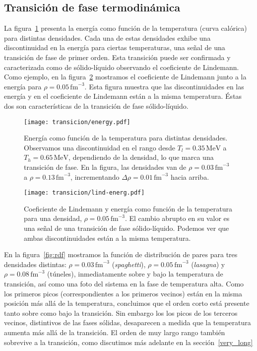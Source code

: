 \subsection{Transición de fase termodinámica}

La figura~\ref{fig:energy} presenta la energía como función de la temperatura (curva calórica) para distintas densidades.
Cada una de estas densidades exhibe una discontinuidad en la energía para ciertas temperaturas, una señal de una transición de fase de primer orden.
Esta transición puede ser confirmada y caracterizada como de sólido-líquido observando el coeficiente de Lindemann.
Como ejemplo, en la figura~\ref{fig:lind-energ} mostramos el coeficiente de Lindemann junto a la energía para $\rho=0.05\,\text{fm}^{-3}$.
Esta figura muestra que las discontinuidades en las energía y en el coeficiente de Lindemann están a la misma temperatura.
Éstas dos son características de la transición de fase sólido-líquido.

\begin{figure}[h!]  \centering
\texttt{[image: transicion/energy.pdf]}
\caption{Energía como función de la temperatura para distintas densidades.
  Observamos una discontinuidad en el rango desde $T_l=0.35\,\text{MeV}$ a $T_h=0.65\,\text{MeV}$, dependiendo de la densidad, lo que marca una transición de fase.
  En la figura, las densidades van de $\rho=0.03\,\text{fm}^{-3}$ a $\rho=0.13\,\text{fm}^{-3}$, incrementando $\Delta\rho=0.01\,\text{fm}^{-3}$ hacia arriba.}
\label{fig:energy}
\end{figure}

\begin{figure}[h!]  \centering
\texttt{[image: transicion/lind-energ.pdf]}
\caption{Coeficiente de Lindemann y energía como función de la temperatura para una densidad, $\rho=0.05\,\text{fm}^{-3}$.
  El cambio abrupto en su valor es una señal de una transición de fase sólido-líquido.
  Podemos ver que ambas discontinuidades están a la misma temperatura.}
\label{fig:lind-energ}
\end{figure}

En la figura~\ref{fig:rdf} mostramos la función de distribución de pares para tres densidades distintas: $\rho=0.03\,\text{fm}^{-3}$ (\emph{spaghetti}), $\rho=0.05\,\text{fm}^{-3}$ (\emph{lasagna}) y $\rho=0.08\,\text{fm}^{-3}$ (túneles), inmediatamente sobre y bajo la temperatura de transición, así como una foto del sistema en la fase de temperatura alta.
Como los primeros picos (correspondientes a los primeros vecinos) están en la misma posición más allá de la temperatura, concluimos que el orden corto está presente tanto sobre como bajo la transición.
Sin embargo los los picos de los terceros vecinos, distintivos de las fases sólidas, desaparecen a medida que la temperatura aumenta más allá de la transición.
El orden de muy largo rango también sobrevive a la transición, como discutimos más adelante en la sección~\ref{very_long}

